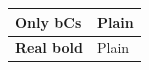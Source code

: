 \documentclass[11pt,a4paper]{article}
\begin{document}
\begin{table}[h]
\begin{tabular}{|l|l|}
\hline
Only bCs & Plain \\ \hline
\textbf{Real bold} & Plain \\ \hline
\end{tabular}
\end{table}
\end{document}
